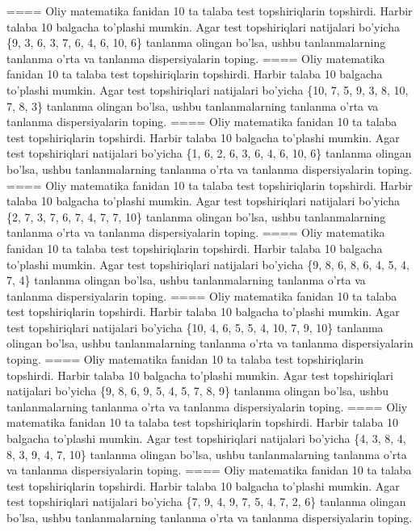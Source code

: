 ====
Oliy matematika fanidan 10 ta talaba test topshiriqlarin topshirdi. Harbir talaba 10 balgacha to'plashi mumkin. Agar test topshiriqlari natijalari bo'yicha \{9, 3, 6, 3, 7, 6, 4, 6, 10, 6\} tanlanma olingan bo'lsa, ushbu tanlanmalarning tanlanma o'rta va tanlanma dispersiyalarin toping.
====
Oliy matematika fanidan 10 ta talaba test topshiriqlarin topshirdi. Harbir talaba 10 balgacha to'plashi mumkin. Agar test topshiriqlari natijalari bo'yicha \{10, 7, 5, 9, 3, 8, 10, 7, 8, 3\} tanlanma olingan bo'lsa, ushbu tanlanmalarning tanlanma o'rta va tanlanma dispersiyalarin toping.
====
Oliy matematika fanidan 10 ta talaba test topshiriqlarin topshirdi. Harbir talaba 10 balgacha to'plashi mumkin. Agar test topshiriqlari natijalari bo'yicha \{1, 6, 2, 6, 3, 6, 4, 6, 10, 6\} tanlanma olingan bo'lsa, ushbu tanlanmalarning tanlanma o'rta va tanlanma dispersiyalarin toping.
====
Oliy matematika fanidan 10 ta talaba test topshiriqlarin topshirdi. Harbir talaba 10 balgacha to'plashi mumkin. Agar test topshiriqlari natijalari bo'yicha \{2, 7, 3, 7, 6, 7, 4, 7, 7, 10\} tanlanma olingan bo'lsa, ushbu tanlanmalarning tanlanma o'rta va tanlanma dispersiyalarin toping.
====
Oliy matematika fanidan 10 ta talaba test topshiriqlarin topshirdi. Harbir talaba 10 balgacha to'plashi mumkin. Agar test topshiriqlari natijalari bo'yicha \{9, 8, 6, 8, 6, 4, 5, 4, 7, 4\} tanlanma olingan bo'lsa, ushbu tanlanmalarning tanlanma o'rta va tanlanma dispersiyalarin toping.
====
Oliy matematika fanidan 10 ta talaba test topshiriqlarin topshirdi. Harbir talaba 10 balgacha to'plashi mumkin. Agar test topshiriqlari natijalari bo'yicha \{10, 4, 6, 5, 5, 4, 10, 7, 9, 10\} tanlanma olingan bo'lsa, ushbu tanlanmalarning tanlanma o'rta va tanlanma dispersiyalarin toping.
====
Oliy matematika fanidan 10 ta talaba test topshiriqlarin topshirdi. Harbir talaba 10 balgacha to'plashi mumkin. Agar test topshiriqlari natijalari bo'yicha \{9, 8, 6, 9, 5, 4, 5, 7, 8, 9\} tanlanma olingan bo'lsa, ushbu tanlanmalarning tanlanma o'rta va tanlanma dispersiyalarin toping.
====
Oliy matematika fanidan 10 ta talaba test topshiriqlarin topshirdi. Harbir talaba 10 balgacha to'plashi mumkin. Agar test topshiriqlari natijalari bo'yicha \{4, 3, 8, 4, 8, 3, 9, 4, 7, 10\} tanlanma olingan bo'lsa, ushbu tanlanmalarning tanlanma o'rta va tanlanma dispersiyalarin toping.
====
Oliy matematika fanidan 10 ta talaba test topshiriqlarin topshirdi. Harbir talaba 10 balgacha to'plashi mumkin. Agar test topshiriqlari natijalari bo'yicha \{7, 9, 4, 9, 7, 5, 4, 7, 2, 6\} tanlanma olingan bo'lsa, ushbu tanlanmalarning tanlanma o'rta va tanlanma dispersiyalarin toping.

